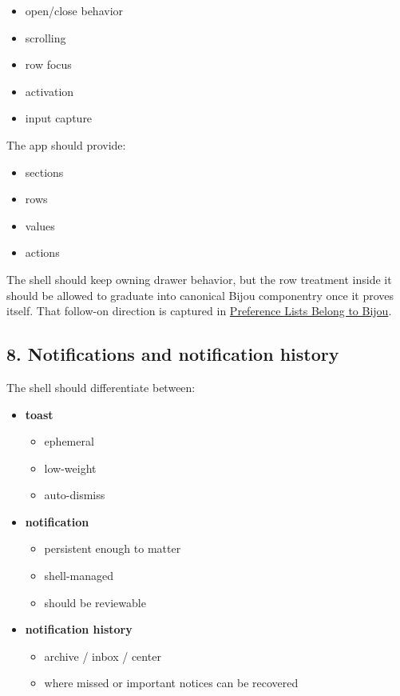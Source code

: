 \begin{itemize}
\tightlist
\item
  open/close behavior
\item
  scrolling
\item
  row focus
\item
  activation
\item
  input capture
\end{itemize}

The app should provide:

\begin{itemize}
\tightlist
\item
  sections
\item
  rows
\item
  values
\item
  actions
\end{itemize}

The shell should keep owning drawer behavior, but the row treatment inside it should be allowed to graduate into canonical Bijou componentry once it proves itself. That follow-on direction is captured in \href{https://github.com/flyingrobots/bijou/blob/cbd70612140e7a450d764b3c7be1c6af878b99bc/docs/strategy/preference-lists-belong-to-bijou.md}{Preference Lists Belong to Bijou}.

\subsection{8. Notifications and notification history}\label{record-047-notifications-and-notification-history}

The shell should differentiate between:

\begin{itemize}
\tightlist
\item
  \textbf{toast}

  \begin{itemize}
  \tightlist
  \item
    ephemeral
  \item
    low-weight
  \item
    auto-dismiss
  \end{itemize}
\item
  \textbf{notification}

  \begin{itemize}
  \tightlist
  \item
    persistent enough to matter
  \item
    shell-managed
  \item
    should be reviewable
  \end{itemize}
\item
  \textbf{notification history}

  \begin{itemize}
  \tightlist
  \item
    archive / inbox / center
  \item
    where missed or important notices can be recovered
  \end{itemize}
\end{itemize}

